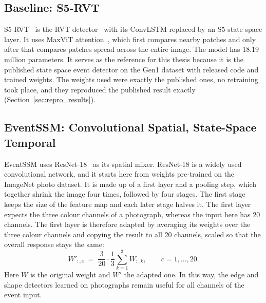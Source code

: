 \documentclass[11pt, a4paper]{report}
\begin{document}
\subsection{Baseline: S5-RVT}
\label{subsec:s5rvt}
S5-RVT~\cite{zubic2024state} is the RVT detector~\cite{gehrig2023recurrent} with its ConvLSTM replaced by
an S5 state space layer. It uses MaxViT attention~\cite{tu2022maxvit}, which first compares nearby patches
and only after that compares patches spread across the entire image. The model has 18.19 million
parameters. It serves as the reference for this thesis because it is the published state space event
detector on the Gen1 dataset with released code and trained weights. The weights used were exactly the
published ones, no retraining took place, and they reproduced the published result exactly
(Section~\ref{sec:repro_results}).

\subsection{EventSSM: Convolutional Spatial, State-Space Temporal}
\label{subsec:eventssm}
EventSSM uses ResNet-18~\cite{he2016deep} as its spatial mixer. ResNet-18 is a widely used convolutional
network, and it starts here from weights pre-trained on the ImageNet photo dataset. It is made up of a
first layer and a pooling step, which together shrink the image four times, followed by four stages. The
first stage keeps the size of the feature map and each later stage halves it. The first layer expects the
three colour channels of a photograph, whereas the input here has 20 channels. The first layer is therefore
adapted by averaging its weights over the three colour channels and copying the result to all 20 channels,
scaled so that the overall response stays the same:
\begin{equation}
  W'_{:,c} \;=\; \frac{3}{20}\cdot\frac{1}{3}\sum_{k=1}^{3} W_{:,k}, \qquad c = 1,\dots,20.
  \label{eq:avg_projection}
\end{equation}
Here $W$ is the original weight and $W'$ the adapted one. In this way, the edge and shape detectors learned
on photographs remain useful for all channels of the event input.
\end{document}
